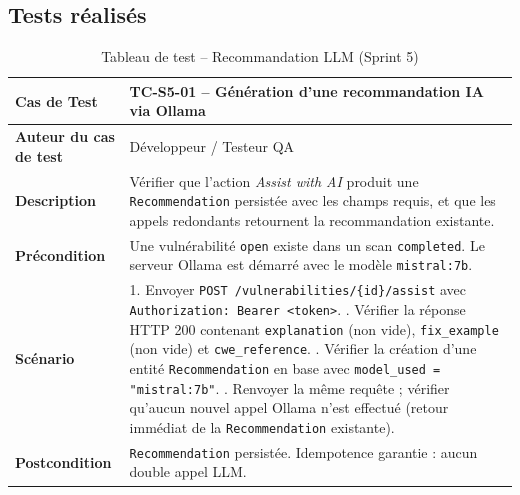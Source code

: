\subsection{Tests réalisés}

\begin{table}[H]
\centering
\caption{Tableau de test -- Recommandation LLM (Sprint 5)}
\label{tab:test-sprint5-llm}
\small
\renewcommand{\arraystretch}{1.3}
\begin{tabularx}{\textwidth}{>{\bfseries}p{3.5cm} X}
\hline
Cas de Test & TC-S5-01 -- Génération d'une recommandation IA via Ollama \\
\hline
Auteur du cas de test & Développeur / Testeur QA \\
\hline
Description & Vérifier que l'action \textit{Assist with AI} produit une \texttt{Recommendation} persistée avec les champs requis, et que les appels redondants retournent la recommandation existante. \\
\hline
Précondition & Une vulnérabilité \texttt{open} existe dans un scan \texttt{completed}. Le serveur Ollama est démarré avec le modèle \texttt{mistral:7b}. \\
\hline
Scénario &
1. Envoyer \texttt{POST /vulnerabilities/\{id\}/assist} avec \texttt{Authorization: Bearer <token>}. \newline
2. Vérifier la réponse HTTP 200 contenant \texttt{explanation} (non vide), \texttt{fix\_example} (non vide) et \texttt{cwe\_reference}. \newline
3. Vérifier la création d'une entité \texttt{Recommendation} en base avec \texttt{model\_used = "mistral:7b"}. \newline
4. Renvoyer la même requête ; vérifier qu'aucun nouvel appel Ollama n'est effectué (retour immédiat de la \texttt{Recommendation} existante). \\
\hline
Postcondition & \texttt{Recommendation} persistée. Idempotence garantie : aucun double appel LLM. \\
\hline
\end{tabularx}
\end{table}

